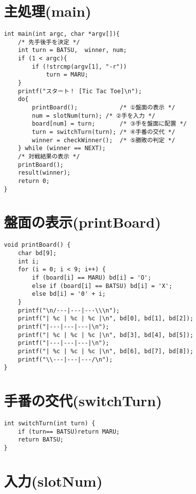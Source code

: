 \documentclass[uplatex,a4paper,11pt,oneside,openany]{jsbook}
\begin{document}
\section{主処理(main)}

\begin{lstlisting}[]
int main(int argc, char *argv[]){
    /* 先手後手を決定 */
    int turn = BATSU,  winner, num;
    if (1 < argc){
        if (!strcmp(argv[1], "-r"))
            turn = MARU;
    }
    printf("スタート！ [Tic Tac Toe]\n");
    do{
        printBoard();            /* ①盤面の表示 */
        num = slotNum(turn); /* ②手を入力 */
        board[num] = turn;       /* ③手を盤面に配置 */
        turn = switchTurn(turn); /* ④手番の交代 */
        winner = checkWinner();  /* ⑤勝敗の判定 */
    } while (winner == NEXT);
    /* 対戦結果の表示 */
    printBoard();
    result(winner);
    return 0;
}
\end{lstlisting}

\section{盤面の表示(printBoard)}

\begin{lstlisting}
void printBoard() {
    char bd[9];
    int i;
    for (i = 0; i < 9; i++) {
        if (board[i] == MARU) bd[i] = 'O';
        else if (board[i] == BATSU) bd[i] = 'X';
        else bd[i] = '0' + i;
    }
    printf("\n/---|---|---\\\n");
    printf("| %c | %c | %c |\n", bd[0], bd[1], bd[2]);
    printf("|---|---|---|\n");
    printf("| %c | %c | %c |\n", bd[3], bd[4], bd[5]);
    printf("|---|---|---|\n");
    printf("| %c | %c | %c |\n", bd[6], bd[7], bd[8]);
    printf("\\---|---|---/\n");
}
\end{lstlisting}

\section{手番の交代(switchTurn)}

\begin{lstlisting}
int switchTurn(int turn) {
    if (turn== BATSU)return MARU;
    return BATSU;
}
\end{lstlisting}

\section{入力(slotNum)}
\end{document}
